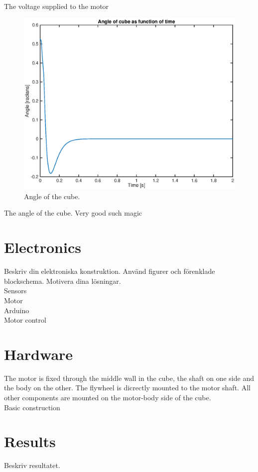 \documentclass[a4paper,11pt]{kth-mag}
\begin{document}
The voltage supplied to the motor

\begin{figure}[!htb]
\centering
\includegraphics[scale=.7]{angleplot.eps}
\caption{Angle of the cube.}
\label{fig:voltageplot}
\end{figure}

The angle of the cube. Very good such magic


\section{Electronics}
Beskriv din elektroniska konstruktion. Använd figurer och förenklade blockschema. Motivera dina lösningar.
\\ Sensors
\\ Motor
\\ Arduino
\\ Motor control


\section{Hardware}
The motor is fixed through the middle wall in the cube, the shaft on one side and the body on the other. The flywheel is dicrectly mounted to the motor shaft. All other components are mounted on the motor-body side of the cube.
\\ Basic construction

\section{Results}
Beskriv resultatet.
\end{document}
